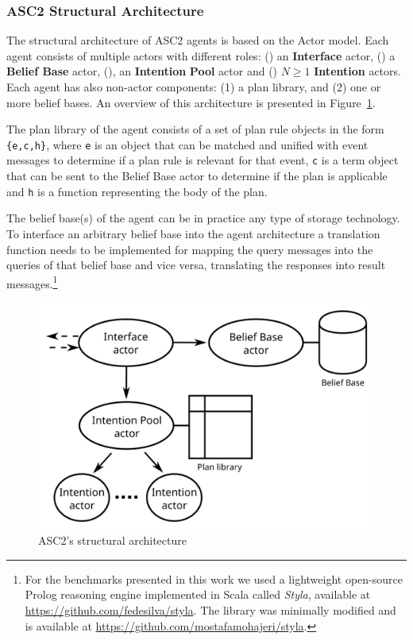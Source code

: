 \subsubsection{ASC2 Structural Architecture}
The structural architecture of ASC2 agents is based on the Actor model. Each agent consists of multiple actors with different roles: () an \textbf{Interface} actor, () a \textbf{Belief Base} actor, (), an \textbf{Intention} \textbf{Pool} actor and () $N \ge 1$ \textbf{Intention} actors. Each agent has also non-actor components: (1) a plan library, and (2) one or more belief bases. An overview of this architecture is presented in Figure~\ref{fig:asc2arch}.

The plan library of the agent consists of a set of plan rule objects in the form \verb+{e,c,h}+, where \verb+e+ is an object that can be matched and unified with event messages to determine if a plan rule is relevant for that event, \verb+c+ is a term object that can be sent to the Belief Base actor to determine if the plan is applicable and \verb+h+ is a function representing the body of the plan.

The belief base(s) of the agent can be in practice any type of storage technology. To interface an arbitrary belief base into the agent architecture a translation function needs to be implemented for mapping the query messages into the queries of that belief base and vice versa, translating the responses into result messages.\footnote{For the benchmarks presented in this work we used a lightweight open-source Prolog reasoning engine implemented in Scala called \textit{Styla}, available at \url{https://github.com/fedesilva/styla}. %
The library was minimally modified and is available at \url{https://github.com/mostafamohajeri/styla}.}

\begin{figure}[t!]
  \centering
  \includegraphics[width=0.70\linewidth]{ch_agere/arch3.png}
  \caption{ASC2's structural architecture}
  \label{fig:asc2arch}
\end{figure}

